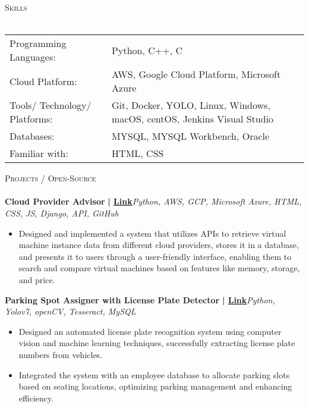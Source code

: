 \documentclass[a4paper]{article}
\newcommand{\lineunder} {
    \vspace*{-8pt} \\
    \hspace*{-18pt} \hrulefill \\
}
\newcommand{\header} [1] {
    {\hspace*{-18pt}\vspace*{6pt} \textsc{#1}}
    \vspace*{-6pt} \lineunder
}
\begin{document}
%
%
\vspace{-3mm}
  \header{Skills}
  \begin{longtable}{p{5cm}p{12cm}}
  Programming Languages: & Python, C++, C \\
  Cloud Platform: & AWS, Google Cloud Platform, Microsoft Azure \\
  Tools/ Technology/ Platforms: & Git, Docker, YOLO, Linux, Windows, macOS, centOS, Jenkins Visual Studio \\
  Databases: & MYSQL, MYSQL Workbench, Oracle \\
  Familiar with: & HTML, CSS
  \end{longtable}



    \vspace{-3mm}
      \header{Projects / Open-Source}
      \vspace{1mm}
      {\textbf{Cloud Provider Advisor}}\textbf{ | \href{https://github.com/Kunal2703/Cloud-Provider-Advisor}{Link}}\hfill{\sl Python, AWS, GCP, Microsoft Azure, HTML, CSS, JS, Django, API, GitHub}\\
          \vspace{-3mm}
\begin{itemize} \itemsep -3pt
\item  Designed and implemented a system that utilizes APIs to retrieve virtual machine instance data from different cloud providers, stores it in a database, and presents it to users through a user-friendly interface, enabling them to search and compare virtual machines based on features like memory, storage, and price.
\end{itemize}


    \vspace{-2.5mm}
      {\textbf{Parking Spot Assigner with License Plate Detector}}\textbf{ | \href{https://github.com/Kunal2703/License-plate-Detection}{Link}}\hfill{\sl Python, Yolov7, openCV, Tesseract, MySQL}\\
          \vspace{-3mm}
\begin{itemize} \itemsep -3pt
\item  Designed an automated license plate recognition system using computer vision and machine learning techniques, successfully extracting license plate numbers from vehicles.
\item  Integrated the system with an employee database to allocate parking slots based on seating locations, optimizing parking management and enhancing efficiency.
\end{itemize}
\end{document}
